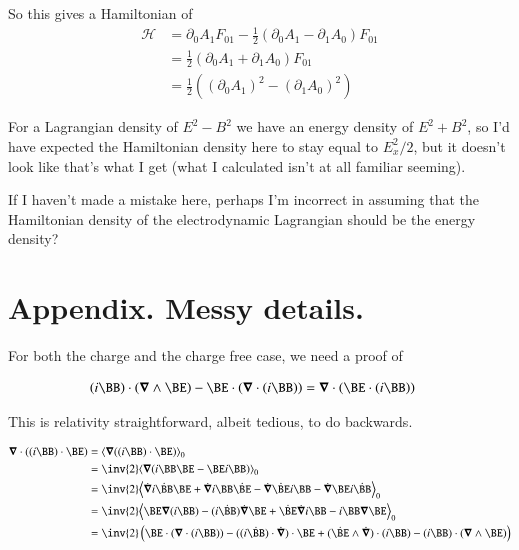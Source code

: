 So this gives a Hamiltonian of
\begin{align*}
\mathcal{H}
&= \partial_0 A_1 F_{01} - \frac{1}{2}(\partial_0 A_1 - \partial_1 A_0)F_{01} \\
&= \frac{1}{2} (\partial_0 A_1 + \partial_1 A_0 )F_{01} \\
&= \frac{1}{2} ((\partial_0 A_1)^2 - (\partial_1 A_0)^2 )
\end{align*}

For a Lagrangian density of $E^2 - B^2$ we have an energy density of $E^2 + B^2$, so I'd have expected the Hamiltonian density here to stay equal to $E_x^2/2$, but it 
doesn't look like that's what I get (what I calculated isn't at all familiar seeming).

If I haven't made a mistake here, perhaps I'm incorrect in assuming that the Hamiltonian density of the electrodynamic Lagrangian should be the energy density?

\section{Appendix.  Messy details. }

For both the charge and the charge free case, we need a proof of 

\begin{align*}
(i\BB) \cdot (\spacegrad \wedge \BE) - \BE \cdot (\spacegrad \cdot (i \BB)) 
&= \spacegrad \cdot (\BE \cdot (i\BB)) 
\end{align*}

This is relativity straightforward, albeit tedious, to do backwards.

\begin{align*}
\spacegrad \cdot ((i \BB) \cdot \BE)
&= \gpgradezero{ \spacegrad ((i \BB) \cdot \BE)} \\
&= \inv{2} \gpgradezero{ \spacegrad ( i \BB \BE - \BE i \BB ) } \\
&= \inv{2} \gpgradezero{ 
  \dot{\spacegrad} i \dot{\BB} \BE 
+ \dot{\spacegrad} i \BB \dot{\BE}
- \dot{\spacegrad} \dot{\BE} i \BB 
- \dot{\spacegrad} \BE i \dot{\BB}
} \\
&= \inv{2} \gpgradezero{ 
  \BE \spacegrad (i \BB) - (i\dot{\BB}) \dot{\spacegrad} \BE
+ \dot{\BE} \dot{\spacegrad} i \BB - i \BB \spacegrad \BE
} \\
&= \inv{2} \left(
  \BE \cdot (\spacegrad \cdot (i \BB)) - ((i\dot{\BB}) \cdot \dot{\spacegrad}) \cdot \BE
+ (\dot{\BE} \wedge \dot{\spacegrad}) \cdot (i \BB) - (i \BB) \cdot (\spacegrad \wedge \BE) 
\right)
\\
\end{align*}

